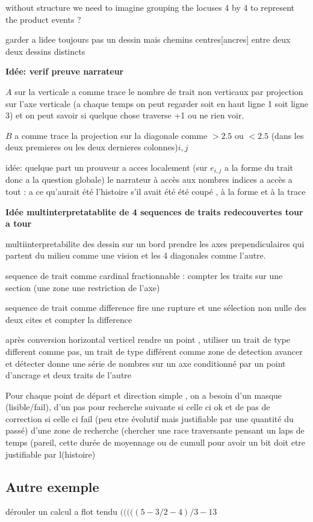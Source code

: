 \documentclass{article}
\begin{document}
without structure we need to imagine grouping the locuses 4 by 4 to represent the product events ?


garder a lidee toujours pas un dessin mais chemins centres[ancres]  entre deux deux dessins distincts

{\bf Idée: verif preuve narrateur}

 
 $A$ sur la verticale a comme trace le nombre de trait non verticaux par projection sur l'axe verticale (a chaque temps on peut regarder soit en haut ligne 1 soit ligne 3) et on peut savoir si quelque chose traverse +1 ou ne rien voir.
 
 $B$ a comme trace la projection sur la diagonale comme $>2.5$ ou $<2.5$ (dans les deux premieres ou les deux dernieres colonnes)${i,j}$
 
 idée: quelque part un prouveur a acces localement (sur $e_{i,j}$ a la forme du trait donc a la question globale)
 le narrateur à accès aux nombres indices a accès a tout :  a ce qu'aurait été l'histoire s'il avait été  été coupé , à la forme et à la trace
 
 
{\bf Idée multinterpretatablite de 4 sequences de traits redecouvertes tour a tour }
 
multiinterpretabilite des dessin sur un bord prendre les axes prependiculaires qui partent du milieu comme une vision et les 4 diagonales comme l'autre. 
  
  sequence de trait comme cardinal  fractionnable : compter les traits sur une section (une zone une restriction de l'axe)
  
  sequence de trait comme difference fire une rupture et une sélection non nulle des deux cites et compter la difference
  
  après conversion horizontal verticel
  rendre un point , utiliser un trait de type different comme pas, un trait de type différent comme zone de detection avancer et détecter donne une série de nombres sur un axe conditionné par un point d'ancrage et deux traits de l'autre 
  
  Pour chaque point de départ et direction simple , on a besoin d'un masque (lisible/fail), d'un pas pour recherche suivante si celle ci ok et de pas de correction si celle ci fail (peu etre évolutif mais justifiable par une quantité du passé) d'une zone de recherche (chercher une race traversante pensant un laps de temps (pareil, cette durée de moyennage ou de cumull  pour avoir un bit doit etre justifiable par l(histoire)
  
\subsection {Autre exemple }
dérouler un calcul a flot tendu $(((((5-3/2-4)/3-13$
\end{document}
